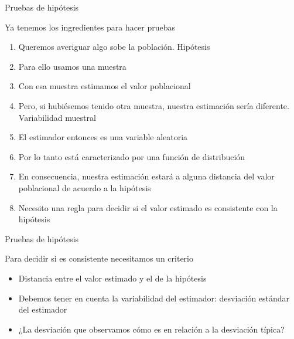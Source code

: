 \documentclass{beamer}
\begin{document}
\begin{frame}{Pruebas de hipótesis}

Ya tenemos los ingredientes para hacer pruebas

\begin{enumerate}
    \item Queremos averiguar algo sobe la población. Hipótesis
    \item Para ello usamos una muestra
    \item Con esa muestra estimamos el valor poblacional
    \item Pero, si hubiésemos tenido otra muestra, nuestra estimación sería diferente. Variabilidad muestral
    \item El estimador entonces es una variable aleatoria
    \item Por lo tanto está caracterizado por una función de distribución
    \item En consecuencia, nuestra estimación estará a alguna distancia del valor poblacional de acuerdo a la hipótesis
    \item Necesito una regla para decidir si el valor estimado es consistente con la hipótesis
\end{enumerate}
    
\end{frame}

\begin{frame}{Pruebas de hipótesis}

Para decidir si es consistente necesitamos un criterio

\begin{itemize}
    \item Distancia entre el valor estimado y el de la hipótesis
    \item Debemos tener en cuenta la variabilidad del estimador: desviación estándar del estimador
    \item ¿La desviación que observamos cómo es en relación a la desviación típica?
\end{itemize}
    
\end{frame}
\end{document}
